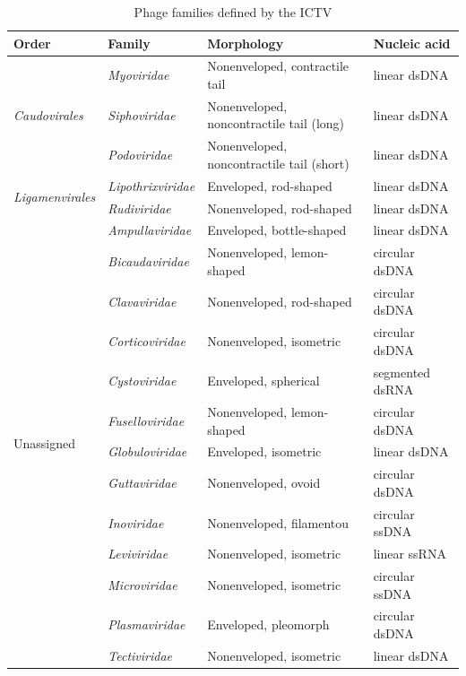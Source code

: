 \begin{table}[t]
    \caption{Phage families defined by the ICTV}
    \centering
    \scriptsize
    \begin{tabularx}{\textwidth}{lXlX}
    \toprule
    Order & Family & Morphology & Nucleic acid \\
    \midrule
    \multirow{3}{*}{\emph{Caudovirales}} & \emph{Myoviridae} & Nonenveloped, contractile tail & linear dsDNA \\
                                  & \emph{Siphoviridae} & Nonenveloped, noncontractile tail (long) & linear dsDNA \\
                                  & \emph{Podoviridae} & Nonenveloped, noncontractile tail (short) & linear dsDNA \\
    \midrule
    \multirow{2}{*}{\emph{Ligamenvirales}} & \emph{Lipothrixviridae} & Enveloped, rod-shaped & linear dsDNA \\
                                    & \emph{Rudiviridae} & Nonenveloped, rod-shaped & linear dsDNA \\
    \midrule
    \multirow{13}{*}{Unassigned} & \emph{Ampullaviridae} & Enveloped, bottle-shaped & linear dsDNA\\
                                 & \emph{Bicaudaviridae} & Nonenveloped, lemon-shaped & circular dsDNA \\
                                 & \emph{Clavaviridae}   & Nonenveloped, rod-shaped & circular dsDNA \\
                                 & \emph{Corticoviridae} & Nonenveloped, isometric & circular dsDNA \\
                                 & \emph{Cystoviridae}   & Enveloped, spherical & segmented dsRNA \\
                                 & \emph{Fuselloviridae} & Nonenveloped, lemon-shaped & circular dsDNA \\
                                 & \emph{Globuloviridae} & Enveloped, isometric& linear dsDNA \\
                                 & \emph{Guttaviridae}   & Nonenveloped, ovoid & circular dsDNA \\
                                 & \emph{Inoviridae}     & Nonenveloped, filamentou& circular ssDNA \\
                                 & \emph{Leviviridae}    & Nonenveloped, isometric & linear ssRNA \\
                                 & \emph{Microviridae}   & Nonenveloped, isometric & circular ssDNA \\
                                 & \emph{Plasmaviridae}  & Enveloped, pleomorph& circular dsDNA \\
                                 & \emph{Tectiviridae}   & Nonenveloped, isometric & linear dsDNA \\
    \bottomrule
    \end{tabularx}
    \label{phage:table:families}
\end{table}

